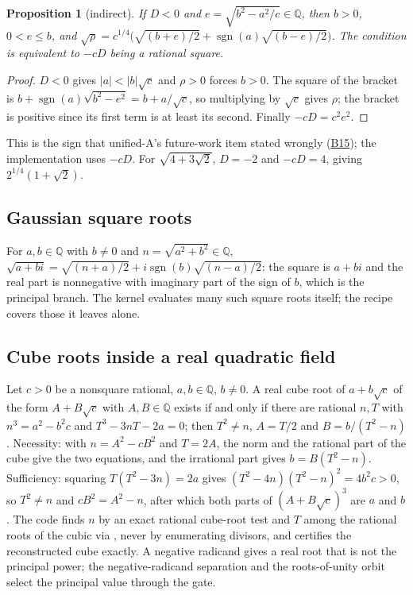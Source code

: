 \documentclass[11pt,oneside]{article}
\numberwithin{equation}{section}
\newtheorem{proposition}[theorem]{Proposition}
\theoremstyle{definition}
\theoremstyle{remark}
\newcommand{\code}[1]{\texttt{\detokenize{#1}}}
\newcommand{\Q}{\mathbb{Q}}
\newcommand{\B}[1]{\hyperref[b:#1]{\textsf{B#1}}}
\DeclareMathOperator{\sgn}{sgn}
\begin{document}
\begin{proposition}[indirect]
If $D<0$ and $e=\sqrt{b^2-a^2/c}\in\Q$, then $b>0$, $0<e\le b$, and $\sqrt\rho=c^{1/4}\bigl(\sqrt{(b+e)/2}+\sgn(a)\sqrt{(b-e)/2}\bigr)$. The condition is equivalent to $-cD$ being a rational square.
\end{proposition}
\begin{proof}
$D<0$ gives $|a|<|b|\sqrt c$ and $\rho>0$ forces $b>0$. The square of the bracket is $b+\sgn(a)\sqrt{b^2-e^2}=b+a/\sqrt c$, so multiplying by $\sqrt c$ gives $\rho$; the bracket is positive since its first term is at least its second. Finally $-cD=c^2e^2$.
\end{proof}
This is the sign that unified-A's future-work item stated wrongly (\B{15}); the implementation uses $-cD$. For $\sqrt{4+3\sqrt2}$, $D=-2$ and $-cD=4$, giving $2^{1/4}(1+\sqrt2)$.

\subsection{Gaussian square roots}
For $a,b\in\Q$ with $b\ne0$ and $n=\sqrt{a^2+b^2}\in\Q$, $\sqrt{a+bi}=\sqrt{(n+a)/2}+i\sgn(b)\sqrt{(n-a)/2}$: the square is $a+bi$ and the real part is nonnegative with imaginary part of the sign of $b$, which is the principal branch. The kernel evaluates many such square roots itself; the recipe covers those it leaves alone.

\subsection{Cube roots inside a real quadratic field}
Let $c>0$ be a nonsquare rational, $a,b\in\Q$, $b\ne0$. A real cube root of $a+b\sqrt c$ of the form $A+B\sqrt c$ with $A,B\in\Q$ exists if and only if there are rational $n,T$ with $n^3=a^2-b^2c$ and $T^3-3nT-2a=0$; then $T^2\ne n$, $A=T/2$ and $B=b/(T^2-n)$. Necessity: with $n=A^2-cB^2$ and $T=2A$, the norm and the rational part of the cube give the two equations, and the irrational part gives $b=B(T^2-n)$. Sufficiency: squaring $T(T^2-3n)=2a$ gives $(T^2-4n)(T^2-n)^2=4b^2c>0$, so $T^2\ne n$ and $cB^2=A^2-n$, after which both parts of $(A+B\sqrt c)^3$ are $a$ and $b$. The code finds $n$ by an exact rational cube-root test and $T$ among the rational roots of the cubic via \code{FactorList}, never by enumerating divisors, and certifies the reconstructed cube exactly. A negative radicand gives a real root that is not the principal power; the negative-radicand separation and the roots-of-unity orbit select the principal value through the gate.
\end{document}
